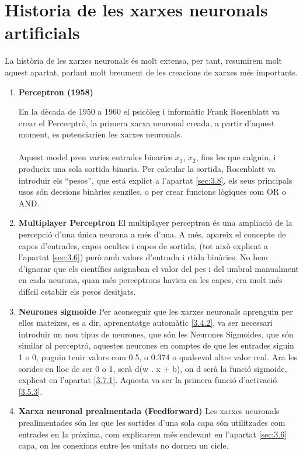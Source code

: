 \section{Historia de les xarxes neuronals artificials}
La història de les xarxes neuronals és molt extensa, per tant, resumirem molt aquest apartat, parlant molt breument de les creacions de xarxes més importants.
\begin{enumerate}
    \item \textbf{Perceptron (1958)}

    En la dècada de 1950 a 1960 el psicòleg i informàtic Frank Rosenblatt va crear el Percecptrò, la primera xarxa neuronal creada, a partir d'aquest moment, es potenciarien les xarxes neuronals.\\ \\
    Aquest model pren varies entrades binaries $x_1$, $x_2$, fins les que calguin, i produeix una sola sortida binaria. Per calcular la sortida, Rosenblatt va introduir els ``pesos'', que está explict a l'apartat \ref{sec:3.8}, els seus principals usos són decsions binàries senziles, o per crear funcions lògiques com OR o AND.

    \item \textbf{Multiplayer Perceptron}
    El multiplayer perceptron és una ampliació de la percepció d'una única neurona a més d'una. A més, apareix el concepte de capes d'entrades, capes ocultes i capes de sortida, (tot això explicat a l'apartat \ref{sec:3.6}) però amb valors d'entrada i rtida binàries. No hem d'ignorar que els científics asignaban el valor del pes i del umbral manualment en cada neurona, quan més perceptrons havien en les capes, era molt més difícil establir els pesos desitjats.

    \item \textbf{Neurones sigmoide}
    Per aconseguir que les xarxes neuronals aprenguin per elles mateixes, es a dir, aprenentatge automàtic \ref{3.4.2}, va ser necessari introduir un nou tipus de neurones, que són les Neurones Sigmoides, que són similar al perceptró, aquestes neurones en comptes de que les entrades siguin 1 o 0, puguin tenir valors com 0.5, o 0.374 o qualsevol altre valor real. Ara les sorides en lloc de ser 0 o 1, serà d(w . x + b), on d serà la funció sigmoide, explicat en l'apartat \ref{3.7.1}. Aquesta va ser la primera funció d'activació \ref{3.5.3}.

    \item \textbf{Xarxa neuronal prealmentada (Feedforward)}
    Les xarxes neuronals prealimentades són les que les sortides d'una sola capa són utilitzades com entrades en la pròxima, com explicarem més endevant en l'apartat \ref{sec:3.6} capa, on les conexions entre les unitats no dornen un cicle.
\end{enumerate}


